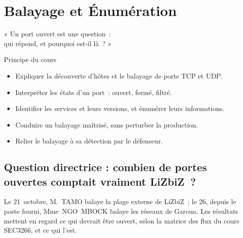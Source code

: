 
\chapter{Balayage et Énumération}
\label{chap:balayage}

\epigraph{%
    « Un port ouvert est une question~:\\
    qui répond, et pourquoi est-il là~? »%
}{Principe du cours}


\begin{boxobjectifs}
\begin{itemize}
    \item Expliquer la découverte d'hôtes et le balayage de ports TCP et UDP.
    \item Interpréter les états d'un port~: ouvert, fermé, filtré.
    \item Identifier les services et leurs versions, et énumérer leurs
          informations.
    \item Conduire un balayage maîtrisé, sans perturber la production.
    \item Relier le balayage à sa détection par le défenseur.
\end{itemize}
\end{boxobjectifs}

\bigskip

\section*{Question directrice : combien de portes ouvertes comptait vraiment LiZbiZ~?}

Le 21~octobre, M.~TAMO balaye la plage externe de LiZbiZ~; le 26, depuis le
poste fourni, Mme~NGO~MBOCK balaye les réseaux de Garoua. Les résultats
mettent en regard ce qui devrait être ouvert, selon la matrice des flux du
cours SEC3266, et ce qui l'est.


